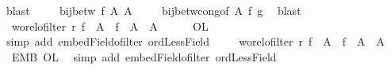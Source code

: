 \begin{isabellebody}
\ blast\isanewline
\ \ \isamarkupfalse%
\ {}{\isacharcolon}{\kern0pt}\ {\isachardoublequoteopen}{\isasymnot}{\isacharparenleft}{\kern0pt}bij{\isacharunderscore}{\kern0pt}betw\ f{}{}\ {\isacharquery}{\kern0pt}A{}\ {\isacharquery}{\kern0pt}A{}{\isacharparenright}{\kern0pt}{\isachardoublequoteclose}\isanewline
\ \ \isamarkupfalse%
\ {}\ bij{\isacharunderscore}{\kern0pt}betw{\isacharunderscore}{\kern0pt}cong{\isacharbrackleft}{\kern0pt}of\ {\isacharquery}{\kern0pt}A{}\ f{}{}\ g{}{}{\isacharbrackright}{\kern0pt}\ \isamarkupfalse%
\ blast\isanewline
\ \ \isanewline
\ \ \isamarkupfalse%
\ {}{\isacharcolon}{\kern0pt}\ {\isachardoublequoteopen}wo{\isacharunderscore}{\kern0pt}rel{\isachardot}{\kern0pt}ofilter\ r{}\ {\isacharparenleft}{\kern0pt}f{}{}\ {\isacharbackquote}{\kern0pt}\ {\isacharquery}{\kern0pt}A{}{\isacharparenright}{\kern0pt}\ {\isasymand}\ f{}{}\ {\isacharbackquote}{\kern0pt}\ {\isacharquery}{\kern0pt}A{}\ {\isasymnoteq}\ {\isacharquery}{\kern0pt}A{}{\isachardoublequoteclose}\isanewline
\ \ \isamarkupfalse%
\ {}\ {}\ OL{}{}\ \isamarkupfalse%
\ {\isacharparenleft}{\kern0pt}simp\ add{\isacharcolon}{\kern0pt}\ embed{\isacharunderscore}{\kern0pt}Field{\isacharunderscore}{\kern0pt}ofilter\ ordLess{\isacharunderscore}{\kern0pt}Field{\isacharparenright}{\kern0pt}\isanewline
\ \ \isamarkupfalse%
\ {}{\isacharcolon}{\kern0pt}\ {\isachardoublequoteopen}wo{\isacharunderscore}{\kern0pt}rel{\isachardot}{\kern0pt}ofilter\ r{}\ {\isacharparenleft}{\kern0pt}f{}{}\ {\isacharbackquote}{\kern0pt}\ {\isacharquery}{\kern0pt}A{}{\isacharparenright}{\kern0pt}\ {\isasymand}\ f{}{}\ {\isacharbackquote}{\kern0pt}\ {\isacharquery}{\kern0pt}A{}\ {\isasymnoteq}\ {\isacharquery}{\kern0pt}A{}{\isachardoublequoteclose}\isanewline
\ \ \isamarkupfalse%
\ {}\ EMB{}{}\ OL{}{}\ \isamarkupfalse%
\ {\isacharparenleft}{\kern0pt}simp\ add{\isacharcolon}{\kern0pt}\ embed{\isacharunderscore}{\kern0pt}Field{\isacharunderscore}{\kern0pt}ofilter\ ordLess{\isacharunderscore}{\kern0pt}Field{\isacharparenright}{\kern0pt}\isanewline

\end{isabellebody}
